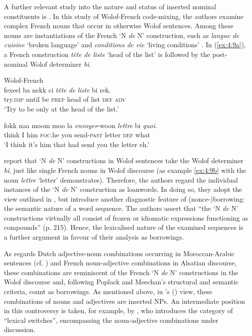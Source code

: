 A further relevant study into the nature and status of inserted nominal constituents is \citet{poplack-meechan-1995}. In this study of Wolof-French code-mixing, the authors examine complex French nouns that occur in otherwise Wolof sentences. Among these nouns are instantiations of the French `N \textit{de} N' construction, such as \textit{langue de cuisine} `broken language' and \textit{conditions de vie} `living conditions' \citep[215]{poplack-meechan-1995}. In (\ref{ex:4:9a}), a French construction \textit{tête de liste} `head of the list' is followed by the post-nominal Wolof determiner \textit{bi}.

\ea Wolof-French \citep[215, 228]{poplack-meechan-1995}\\

\ea{\label{ex:4:9a}}
\gll fexeel ba nekk ci \textit{tête} \textit{de} \textit{liste} bi rek.\\
	try.\textsc{imp} until be \textsc{prep} head of list \textsc{def} \textsc{adv}\\
\glt `Try to be only at the head of the list.' 

\ex{\label{ex:4:9b}}
\gll fokk naa moom moo la \textit{envoyer}-woon \textit{lettre} bi \textit{quoi}.\\
	think I him \textsc{foc}.he you send-\textsc{past} letter \textsc{def} what\\
\glt `I think it's him that had send you the letter eh.' 
\z

\z

\noindent \citet[215]{poplack-meechan-1995} report that `N \textit{de} N' constructions in Wolof sentences take the Wolof determiner \textit{bi}, just like single French nouns in Wolof discourse (as example \ref{ex:4:9b} with the noun \textit{lettre} `letter' demonstrates). Therefore, the authors regard the individual instances of the `N \textit{de} N' construction as loanwords. In doing so, they adopt the view outlined in \citet{sankoff-et-al-1990}, but introduce another diagnostic feature of (nonce-)borrowing: the semantic nature of a word sequence. The authors assert that ``the `N \textit{de} N' constructions virtually all consist of frozen or idiomatic expressions functioning as compounds'' (p. 215). Hence, the lexicalised nature of the examined sequences is a further argument in favour of their analysis as borrowings. 

As regards Dutch adjective-noun combinations occurring in Moroccan-Arabic sentences (cf. ) and French noun-adjective combinations in Alsatian discourse, these combinations are reminiscent of the French `N \textit{de} N' constructions in the Wolof discourse and, following Poplack and Meechan's structural and semantic criteria, count as borrowings. As mentioned above, in  \citeauthor{muysken-bilingual-2000}'s (\citeyear{muysken-bilingual-2000}) view, these combinations of nouns and adjectives are inserted NPs. An intermediate position in this controversy is taken, for example, by \citet[141]{gardner-chloros-1991}, who introduces the category of “lexical switches”, encompassing the noun-adjective combinations under discussion.

